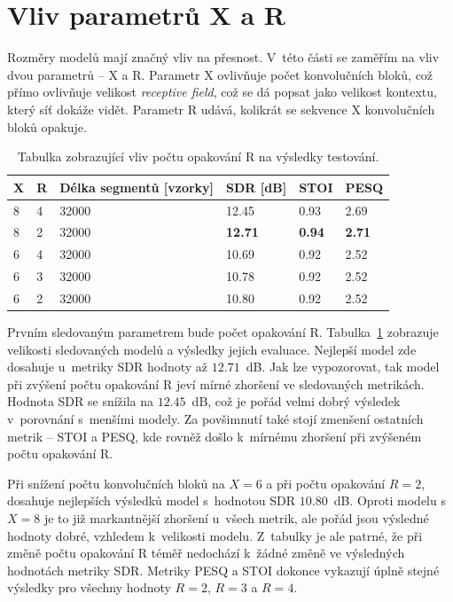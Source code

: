 \section{Vliv parametrů X a R}
Rozměry modelů mají značný vliv na přesnost. V~této části se zaměřím na vliv dvou parametrů -- X a R. Parametr X ovlivňuje počet konvolučních bloků, což přímo ovlivňuje velikost \textit{receptive field}, což se dá popsat jako velikost kontextu, který síť dokáže vidět. Parametr R udává, kolikrát se sekvence X konvolučních bloků opakuje. 

\begin{table}[!htbp]
\centering
\caption{Tabulka zobrazující vliv počtu opakování R na výsledky testování.}
\label{tab:vliv-R}
\begin{tabular}{|l|l|l|l|l|l|}
\hline
\textbf{X} & \textbf{R} & \textbf{Délka segmentů {[}vzorky{]}} & \textbf{SDR {[}dB{]}} & \textbf{STOI} & \textbf{PESQ} \\ \hline
8 & 4 & 32000 & 12.45 & 0.93 & 2.69 \\ \hline
8 & 2 & 32000 & \textbf{12.71} & \textbf{0.94} & \textbf{2.71} \\ \hline
6 & 4 & 32000 & 10.69 & 0.92 & 2.52 \\ \hline
6 & 3 & 32000 & 10.78 & 0.92 & 2.52 \\ \hline
6 & 2 & 32000 & 10.80 & 0.92 & 2.52 \\ \hline
\end{tabular}
\end{table}

Prvním sledovaným parametrem bude počet opakování R. Tabulka~\ref{tab:vliv-R} zobrazuje velikosti sledovaných modelů a výsledky jejich evaluace. Nejlepší model zde dosahuje u~metriky SDR hodnoty až $12.71$~dB. Jak lze vypozorovat, tak model při zvýšení počtu opakování R jeví mírné zhoršení ve sledovaných metrikách. Hodnota SDR se snížila na $12.45$~dB, což je pořád velmi dobrý výsledek v~porovnání s~menšími modely. Za povšimnutí také stojí zmenšení ostatních metrik -- STOI a PESQ, kde rovněž došlo k~mírnému zhoršení při zvýšeném počtu opakování R.

Při snížení počtu konvolučních bloků na $X = 6$ a při počtu opakování $R=2$, dosahuje nejlepších výsledků model s~hodnotou SDR $10.80$~dB. Oproti modelu s~$X=8$ je to již markantnější zhoršení u~všech metrik, ale pořád jsou výsledné hodnoty dobré, vzhledem k~velikosti modelu. Z~tabulky je ale patrné, že při změně počtu opakování R téměř nedochází k~žádné změně ve výsledných hodnotách metriky SDR. Metriky PESQ a STOI dokonce vykazují úplně stejné výsledky pro všechny hodnoty $R=2$, $R=3$ a $R=4$.

